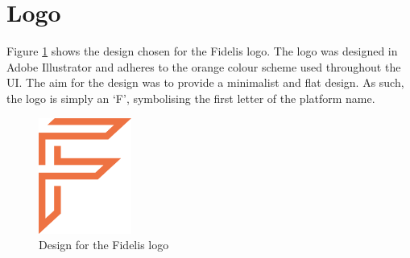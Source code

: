\section{Logo}
Figure \ref{fig:Logo} shows the design chosen for the Fidelis logo. The logo was designed in Adobe Illustrator and adheres to the orange colour scheme used throughout the UI. The aim for the design was to provide a minimalist and flat design. As such, the logo is simply an `F', symbolising the first letter of the platform name.

\begin{figure}[H]
\centering
\includegraphics[height=1.5in]{Images/Design/Logo}
\caption{Design for the Fidelis logo}
\label{fig:Logo}
\end{figure}